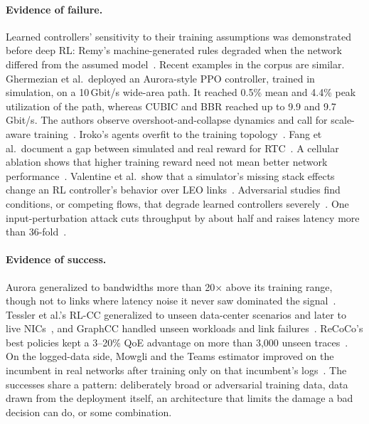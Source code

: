 \paragraph{Evidence of failure.} Learned controllers' sensitivity to their training assumptions was demonstrated before deep RL: Remy's machine-generated rules degraded when the network differed from the assumed model~\cite{sivaraman2014learnability}. Recent examples in the corpus are similar. Ghermezian et al.\ deployed an Aurora-style PPO controller, trained in simulation, on a 10\,Gbit/s wide-area path. It reached 0.5\% mean and 4.4\% peak utilization of the path, whereas CUBIC and BBR reached up to 9.9 and 9.7\,Gbit/s. The authors observe overshoot-and-collapse dynamics and call for scale-aware training~\cite{ghermezian2026ppo}. Iroko's agents overfit to the training topology~\cite{ruffy2018iroko}. Fang et al.\ document a gap between simulated and real reward for RTC~\cite{fang2019rtc}. A cellular ablation shows that higher training reward need not mean better network performance~\cite{naqvi2022ablation}. Valentine et al.\ show that a simulator's missing stack effects change an RL controller's behavior over LEO links~\cite{valentine2026emulation}. Adversarial studies find conditions, or competing flows, that degrade learned controllers severely~\cite{gilad2019robustifying,chen2025exploring}. One input-perturbation attack cuts throughput by about half and raises latency more than 36-fold~\cite{yang2022good}.

\paragraph{Evidence of success.} Aurora generalized to bandwidths more than 20$\times$ above its training range, though not to links where latency noise it never saw dominated the signal~\cite{jay2019aurora}. Tessler et al.'s RL-CC generalized to unseen data-center scenarios and later to live NICs~\cite{tessler2022rlcc,fuhrer2023nvidia}, and GraphCC handled unseen workloads and link failures~\cite{bernardez2024graphcc}. ReCoCo's best policies kept a 3--20\% QoE advantage on more than 3,000 unseen traces~\cite{markudova2026advancing}. On the logged-data side, Mowgli and the Teams estimator improved on the incumbent in real networks after training only on that incumbent's logs~\cite{agarwal2025mowgli,khairy2026human}. The successes share a pattern: deliberately broad or adversarial training data, data drawn from the deployment itself, an architecture that limits the damage a bad decision can do, or some combination.

